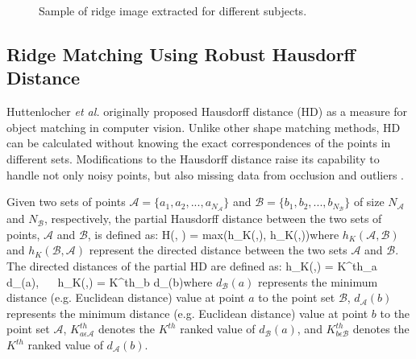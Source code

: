 \begin{figure}[tbp]
\begin{center}
 \caption{Sample of ridge image extracted for different
subjects.} \label{fig_ridge_points}
\end{center}
\end{figure}

\subsection{Ridge Matching Using Robust Hausdorff Distance}
Huttenlocher \textit{et al.} originally proposed Hausdorff distance
(HD) \cite{huttenlocher93} as a measure for object matching in
computer vision. Unlike other shape matching methods, HD can be
calculated without knowing the exact correspondences of the points
in different sets. Modifications to the Hausdorff distance raise its
capability to handle not only noisy points, but also missing data
from occlusion and outliers \cite{huttenlocher99}.

Given two sets of points $\mathcal{A} = \{a_1, a_2, ...,
a_{N_\mathcal{A}}\}$ and $\mathcal{B} = \{b_1, b_2, ...,
b_{N_\mathcal{B}}\}$ of size $N_\mathcal{A}$ and $N_\mathcal{B}$,
respectively, the partial Hausdorff distance between the two sets of
points, $\mathcal{A}$ and $\mathcal{B}$, is defined as: \beq
H(, ) = max(h_K(,),
h_K(,))\eeq where
$h_K(\mathcal{A},\mathcal{B})$ and $h_K(\mathcal{B},\mathcal{A})$
represent the directed distance between the two sets $\mathcal{A}$
and $\mathcal{B}$. The directed distances of the partial HD are
defined as: \beq h_K(,) = K^{th}_{a\epsilon
{}} d_{}(a), ~~ h_K(,) =
K^{th}_{b\epsilon {}} d_{}(b)\eeq where
$d_{\mathcal{B}}(a)$ represents the minimum distance (e.g. Euclidean
distance) value at point $a$ to the point set $\mathcal{B}$,
$d_{\mathcal{A}}(b)$ represents the minimum distance (e.g. Euclidean
distance) value at point $b$ to the point set $\mathcal{A}$,
$K^{th}_{a \epsilon \mathcal{A}}$ denotes the $K^{th}$ ranked value
of $d_\mathcal{B}(a)$, and $K^{th}_{b \epsilon \mathcal{B}}$ denotes
the $K^{th}$ ranked value of $d_\mathcal{A}(b)$.

